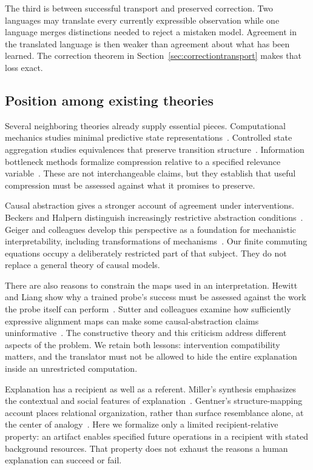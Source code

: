\documentclass[11pt,letterpaper]{article}
\theoremstyle{plain}
\theoremstyle{definition}
\begin{document}
The third is between successful transport and preserved correction. Two languages may translate every currently expressible observation while one language merges distinctions needed to reject a mistaken model. Agreement in the translated language is then weaker than agreement about what has been learned. The correction theorem in Section~\ref{sec:correctiontransport} makes that loss exact.

\subsection{Position among existing theories}
Several neighboring theories already supply essential pieces. Computational mechanics studies minimal predictive state representations~\cite{shalizi}. Controlled state aggregation studies equivalences that preserve transition structure~\cite{givan}. Information bottleneck methods formalize compression relative to a specified relevance variable~\cite{tishby}. These are not interchangeable claims, but they establish that useful compression must be assessed against what it promises to preserve.

Causal abstraction gives a stronger account of agreement under interventions. Beckers and Halpern distinguish increasingly restrictive abstraction conditions~\cite{beckers}. Geiger and colleagues develop this perspective as a foundation for mechanistic interpretability, including transformations of mechanisms~\cite{geiger}. Our finite commuting equations occupy a deliberately restricted part of that subject. They do not replace a general theory of causal models.

There are also reasons to constrain the maps used in an interpretation. Hewitt and Liang show why a trained probe's success must be assessed against the work the probe itself can perform~\cite{hewitt}. Sutter and colleagues examine how sufficiently expressive alignment maps can make some causal-abstraction claims uninformative~\cite{sutter}. The constructive theory and this criticism address different aspects of the problem. We retain both lessons: intervention compatibility matters, and the translator must not be allowed to hide the entire explanation inside an unrestricted computation.

Explanation has a recipient as well as a referent. Miller's synthesis emphasizes the contextual and social features of explanation~\cite{miller}. Gentner's structure-mapping account places relational organization, rather than surface resemblance alone, at the center of analogy~\cite{gentner}. Here we formalize only a limited recipient-relative property: an artifact enables specified future operations in a recipient with stated background resources. That property does not exhaust the reasons a human explanation can succeed or fail.
\end{document}
